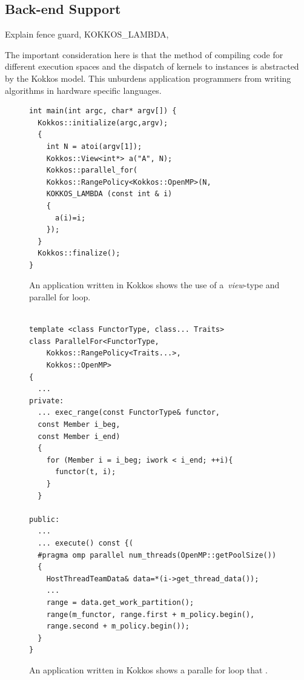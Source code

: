 \subsection{Back-end Support}\label{chap:kokkosBackend}



Explain fence guard, KOKKOS\_LAMBDA, 


The important consideration here is that the method of compiling code for different execution spaces and the dispatch of kernels to instances is abstracted by the Kokkos model. This unburdens application programmers from writing algorithms in hardware specific languages.

\begin{figure}
\begin{small}
\begin{Verbatim}[frame=leftline]
int main(int argc, char* argv[]) {
  Kokkos::initialize(argc,argv);
  {
    int N = atoi(argv[1]);
    Kokkos::View<int*> a("A", N);  
    Kokkos::parallel_for(
    Kokkos::RangePolicy<Kokkos::OpenMP>(N,
    KOKKOS_LAMBDA (const int & i)
    {
      a(i)=i;
    }); 
  }
  Kokkos::finalize();
}
\end{Verbatim}
\end{small}
\caption{An application written in Kokkos shows the use of a~\emph{view}-type and parallel for loop.}
\label{fig:KokkosExample}
\end{figure}



\begin{figure}
\begin{small}
\begin{Verbatim}[frame=leftline]

template <class FunctorType, class... Traits>
class ParallelFor<FunctorType, 
    Kokkos::RangePolicy<Traits...>, 
    Kokkos::OpenMP> 
{
  ...
private:
  ... exec_range(const FunctorType& functor, 
  const Member i_beg,
  const Member i_end) 
  {
    for (Member i = i_beg; iwork < i_end; ++i){
      functor(t, i);
    }
  }

public:
  ...
  ... execute() const {(
  #pragma omp parallel num_threads(OpenMP::getPoolSize())
  {
    HostThreadTeamData& data=*(i->get_thread_data());
    ...
    range = data.get_work_partition();
    range(m_functor, range.first + m_policy.begin(),
    range.second + m_policy.begin());
  }
}

\end{Verbatim}
\end{small}
\caption{An application written in Kokkos shows a paralle for loop that .}
\label{fig:KokkosExample}
\end{figure}

